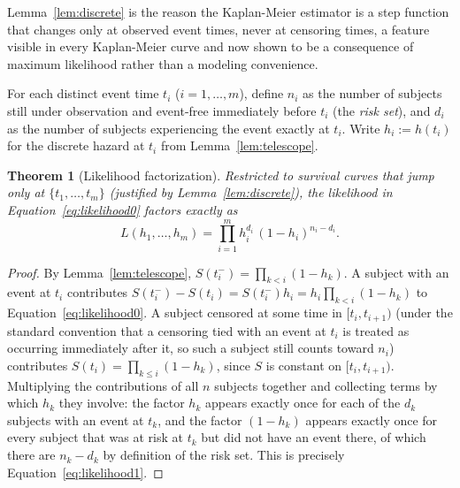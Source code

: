 \documentclass[11pt]{article}
\newtheorem{theorem}{Theorem}
\theoremstyle{remark}
\theoremstyle{definition}
\begin{document}
Lemma~\ref{lem:discrete} is the reason the Kaplan-Meier estimator is a step function that changes only at observed event times, never at censoring times, a feature visible in every Kaplan-Meier curve and now shown to be a consequence of maximum likelihood rather than a modeling convenience.

For each distinct event time $t_i$ ($i=1,\ldots,m$), define $n_i$ as the number of subjects still under observation and event-free immediately before $t_i$ (the \emph{risk set}), and $d_i$ as the number of subjects experiencing the event exactly at $t_i$. Write $h_i:=h(t_i)$ for the discrete hazard at $t_i$ from Lemma~\ref{lem:telescope}.

\begin{theorem}[Likelihood factorization]
\label{thm:factorization}
Restricted to survival curves that jump only at $\{t_1,\ldots,t_m\}$ (justified by Lemma~\ref{lem:discrete}), the likelihood in Equation~\eqref{eq:likelihood0} factors exactly as
\begin{equation}
L(h_1,\ldots,h_m) = \prod_{i=1}^{m} h_i^{d_i}\,(1-h_i)^{n_i-d_i}.
\label{eq:likelihood1}
\end{equation}
\end{theorem}
\begin{proof}
By Lemma~\ref{lem:telescope}, $S(t_i^-)=\prod_{k<i}(1-h_k)$. A subject with an event at $t_i$ contributes $S(t_i^-)-S(t_i) = S(t_i^-)h_i = h_i\prod_{k<i}(1-h_k)$ to Equation~\eqref{eq:likelihood0}. A subject censored at some time in $[t_i,t_{i+1})$ (under the standard convention that a censoring tied with an event at $t_i$ is treated as occurring immediately after it, so such a subject still counts toward $n_i$) contributes $S(t_i) = \prod_{k\le i}(1-h_k)$, since $S$ is constant on $[t_i,t_{i+1})$. Multiplying the contributions of all $n$ subjects together and collecting terms by which $h_k$ they involve: the factor $h_k$ appears exactly once for each of the $d_k$ subjects with an event at $t_k$, and the factor $(1-h_k)$ appears exactly once for every subject that was at risk at $t_k$ but did not have an event there, of which there are $n_k-d_k$ by definition of the risk set. This is precisely Equation~\eqref{eq:likelihood1}.
\end{proof}
\end{document}
